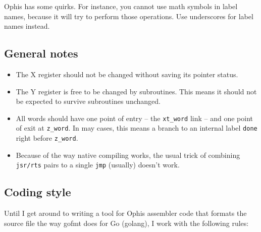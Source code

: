 Ophis has some quirks. For instance, you cannot use math symbols in label names,
because it will try to perform those operations. Use underscores for label names
instead.

\subsection{General notes}

\begin{itemize}

        \item The X register should not be changed without
                saving its pointer status.

        \item The Y register is free to be changed by
                subroutines. This means it should not be expected to survive
                subroutines unchanged.

        \item All words should have one point of entry -- the \texttt{xt\_word}
                link -- and one point of exit at \texttt{z\_word}. In may cases,
                this means a branch to an internal label \texttt{done} right
                before \texttt{z\_word}.

        \item Because of the way native compiling works, the usual trick of
                combining \texttt{jsr/rts} pairs to a single \texttt{jmp}
                (usually) doesn't work.

\end{itemize}


\subsection{Coding style}

Until I get around to writing a tool for Ophis assembler
code that formats the source file the way gofmt does for Go (golang),
I work with the following rules:

